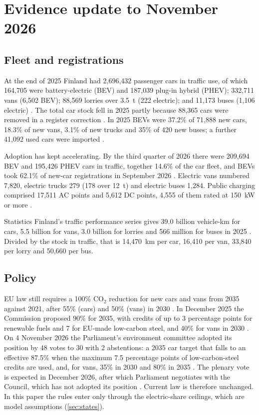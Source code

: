 \documentclass[11pt,a4paper]{article}
\begin{document}
\section{Evidence update to November 2026}\label{sec:evidence}
\subsection{Fleet and registrations}
At the end of 2025 Finland had 2,696,432 passenger cars in traffic use, of which 164,705 were battery-electric (BEV) and 187,039 plug-in hybrid (PHEV); 332,711 vans (6,502 BEV); 88,569 lorries over 3.5~t (222 electric); and 11,173 buses (1,106 electric) \citep{statfin2026_11ie}. The total car stock fell in 2025 partly because 88,365 cars were removed in a register correction \citep{aut2026review}. In 2025 BEVs were 37.2\% of 71,888 new cars, 18.3\% of new vans, 3.1\% of new trucks and 35\% of 420 new buses; a further 41,092 used cars were imported \citep{aut2026review}.

Adoption has kept accelerating. By the third quarter of 2026 there were 209,694 BEV and 195,426 PHEV cars in traffic, together 14.6\% of the car fleet, and BEVs took 62.1\% of new-car registrations in September 2026 \citep{sahkoinenliikenne2026q3}. Electric vans numbered 7,820, electric trucks 279 (178 over 12~t) and electric buses 1,284. Public charging comprised 17,511 AC points and 5,612 DC points, 4,555 of them rated at 150~kW or more \citep{sahkoinenliikenne2026q3}.

Statistics Finland's traffic performance series gives 39.0 billion vehicle-km for cars, 5.5 billion for vans, 3.0 billion for lorries and 566 million for buses in 2025 \citep{statfin2026traffic,statfin2026_12jx}. Divided by the stock in traffic, that is 14,470~km per car, 16,410 per van, 33,840 per lorry and 50,660 per bus.

\subsection{Policy}
EU law still requires a 100\% CO$_2$ reduction for new cars and vans from 2035 against 2021, after 55\% (cars) and 50\% (vans) in 2030 \citep{eprs2026co2}. In December 2025 the Commission proposed 90\% for 2035, with credits of up to 3 percentage points for renewable fuels and 7 for EU-made low-carbon steel, and 40\% for vans in 2030 \citep{eprs2026co2}. On 4 November 2026 the Parliament's environment committee adopted its position by 48 votes to 30 with 2 abstentions: a 2035 car target that falls to an effective 87.5\% when the maximum 7.5 percentage points of low-carbon-steel credits are used, and, for vans, 35\% in 2030 and 80\% in 2035 \citep{eunews2026envi,electrive2026envi}. The plenary vote is expected in December 2026, after which Parliament negotiates with the Council, which has not adopted its position \citep{electrive2026envi}. Current law is therefore unchanged. In this paper the rules enter only through the electric-share ceilings, which are model assumptions (\cref{sec:states}).
\end{document}
